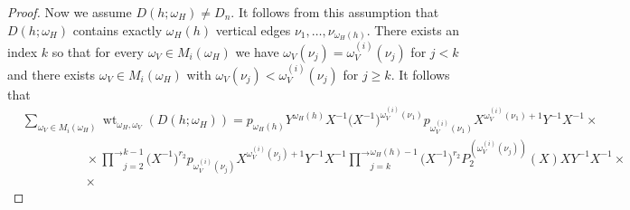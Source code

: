 \documentclass{amsart}
\newcommand{\wt}{\operatorname{wt}}
\begin{document}
\begin{proof}
  \bigskip
  
  Now we assume $D(h;\omega_H)\ne D_n$.  It follows from this assumption that $D(h;\omega_H)$ contains exactly $\omega_H(h)$ vertical edges $\nu_1,\ldots,\nu_{\omega_H(h)}$.  There exists an index $k$ so that for every $\omega_V\in M_i(\omega_H)$ we have $\omega_V(\nu_j)=\omega_V^{(i)}(\nu_j)$ for $j<k$ and there exists $\omega_V\in M_i(\omega_H)$ with $\omega_V(\nu_j)<\omega_V^{(i)}(\nu_j)$ for $j\ge k$.  It follows that
  \begin{align*}
   &\sum\limits_{\omega_V\in M_i(\omega_H)}\wt_{\omega_H,\omega_V}(D(h;\omega_H))
   =p_{\omega_H(h)}Y^{\omega_H(h)}X^{-1}\big(X^{-1}\big)^{\omega_V^{(i)}(\nu_1)}p_{\omega_V^{(i)}(\nu_1)}X^{\omega_V^{(i)}(\nu_1)+1}Y^{-1}X^{-1}\times\\
   &\quad\quad\quad\quad\quad\times\vec\prod_{j=2}^{k-1}\big(X^{-1}\big)^{r_2}p_{\omega_V^{(i)}(\nu_j)}X^{\omega_V^{(i)}(\nu_j)+1}Y^{-1}X^{-1}\vec\prod_{j=k}^{\omega_H(h)-1}\big(X^{-1}\big)^{r_2}P_2^{(\omega_V^{(i)}(\nu_j))}(X)XY^{-1}X^{-1}\times\\
   &\quad\quad\quad\quad\quad\times
  \end{align*}
 \end{proof}
\end{document}
